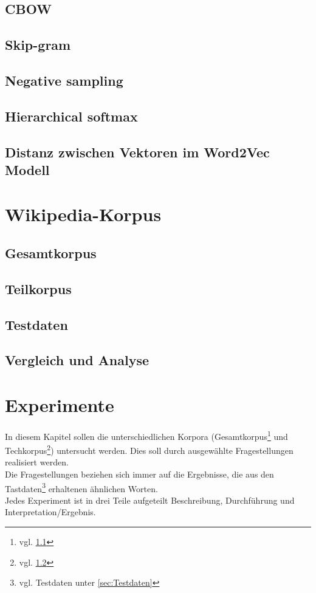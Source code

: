 \documentclass[12pt,a4paper]{article}
\begin{document}
	\subsection{CBOW}
	\subsection{Skip-gram}
	\subsection{Negative sampling}
	\subsection{Hierarchical softmax}
	\subsection{Distanz zwischen Vektoren im Word2Vec Modell}
\newpage
\section{Wikipedia-Korpus}
	\subsection{Gesamtkorpus}
	\label{sec:Gesamtkorpus}
	\subsection{Teilkorpus}
	\label{sec:Teilkorpus}	
	\subsection{Testdaten}
	\subsection{Vergleich und Analyse}
\newpage
\section{Experimente}
In diesem Kapitel sollen die unterschiedlichen Korpora (Gesamtkorpus\footnote{vgl. \ref{sec:Gesamtkorpus}} und Techkorpus\footnote{vgl. \ref{sec:Teilkorpus}}) untersucht werden. Dies soll durch ausgewählte Fragestellungen realisiert werden.
\\Die Fragestellungen beziehen sich immer auf die Ergebnisse, die aus den Tastdaten\footnote{vgl. Testdaten unter \ref{sec:Testdaten}} erhaltenen ähnlichen Worten.
\\Jedes Experiment ist in drei Teile aufgeteilt Beschreibung, Durchführung und Interpretation/Ergebnis.
\end{document}
